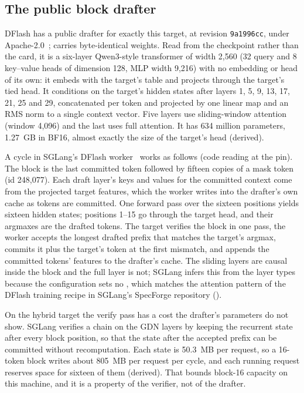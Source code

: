 \subsection{The public block drafter}\label{app:drafter-model}\label{sec:drafter-model}
DFlash has a public drafter for exactly this target,  at revision \texttt{9a1996cc}, under Apache-2.0~\cite{dflashpaper,dflash4bcard};  carries byte-identical weights. Read from the checkpoint rather than the card, it is a six-layer Qwen3-style transformer of width 2,560 (32 query and 8 key--value heads of dimension 128, MLP width 9,216) with no embedding or head of its own: it embeds with the target's table and projects through the target's tied head. It conditions on the target's hidden states after layers 1, 5, 9, 13, 17, 21, 25 and 29, concatenated per token and projected by one linear map and an RMS norm to a single context vector. Five layers use sliding-window attention (window 4,096) and the last uses full attention. It has 634 million parameters, 1.27~GB in BF16, almost exactly the size of the target's head (derived).

A cycle in SGLang's DFlash worker~\cite{sgcode} works as follows (code reading at the pin). The block is the last committed token followed by fifteen copies of a mask token (id 248,077). Each draft layer's keys and values for the committed context come from the projected target features, which the worker writes into the drafter's own cache as tokens are committed. One forward pass over the sixteen positions yields sixteen hidden states; positions 1--15 go through the target head, and their argmaxes are the drafted tokens. The target verifies the block in one pass, the worker accepts the longest drafted prefix that matches the target's argmax, commits it plus the target's token at the first mismatch, and appends the committed tokens' features to the drafter's cache. The sliding layers are causal inside the block and the full layer is not; SGLang infers this from the layer types because the configuration sets no , which matches the attention pattern of the DFlash training recipe in SGLang's SpecForge repository ().

On the hybrid target the verify pass has a cost the drafter's parameters do not show. SGLang verifies a chain on the GDN layers by keeping the recurrent state after every block position, so that the state after the accepted prefix can be committed without recomputation. Each state is 50.3~MB per request, so a 16-token block writes about 805~MB per request per cycle, and each running request reserves space for sixteen of them (derived). That bounds block-16 capacity on this machine, and it is a property of the verifier, not of the drafter.

